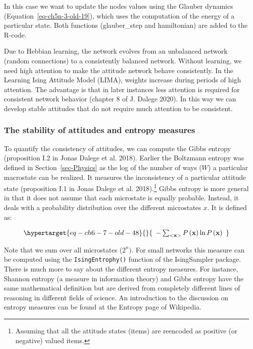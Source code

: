 \documentclass[
  a4paper,
  DIV=11,
  numbers=noendperiod,
  oneside]{scrreprt}
\begin{document}
In this case we want to update the nodes values using the Glauber
dynamics (Equation~\ref{eq-ch5n-3-old-19}), which uses the computation
of the energy of a particular state. Both functions (glauber\_step and
hamiltonian) are added to the R-code.

Due to Hebbian learning, the network evolves from an unbalanced network
(random connections) to a consistently balanced network. Without
learning, we need high attention to make the attitude network behave
consistently. In the Learning Ising Attitude Model (LIMA), weights
increase during periods of high attention. The advantage is that in
later instances less attention is required for consistent network
behavior (chapter 8 of J. Dalege 2020). In this way we can develop
stable attitudes that do not require much attention to be consistent.

\hypertarget{sec-The-stability-of-attitudes-and-entropy-measures}{%
\subsubsection{The stability of attitudes and entropy
measures}\label{sec-The-stability-of-attitudes-and-entropy-measures}}

To quantify the consistency of attitudes, we can compute the Gibbs
entropy (proposition I.2 in Jonas Dalege et al. 2018). Earlier the
Boltzmann entropy was defined in Section~\ref{sec-Physics} as the log of
the number of ways (\(W\)) a particular macrostate can be realized. It
measures the inconsistency of a particular attitude state (proposition
I.1 in Jonas Dalege et al. 2018).\footnote{Assuming that all the
  attitude states (items) are reencoded as positive (or negative) valued
  items.} Gibbs entropy is more general in that it does not assume that
each microstate is equally probable. Instead, it deals with a
probability distribution over the different microstates \(x\). It is
defined as:

\begin{equation}\protect\hypertarget{eq-ch6-7-old-48}{}{\begin{array}{r}
 - \sum_{< \mathbf{x} >}^{}{P\left( \mathbf{x} \right)\ln{P\left( \mathbf{x} \right)}}
\end{array}}\label{eq-ch6-7-old-48}\end{equation}

Note that we sum over all microstates (\(2^{n})\). For small networks
this measure can be computed using the \texttt{IsingEntrophy()} function
of the IsingSampler package. There is much more to say about the
different entropy measures. For instance, Shannon entropy (a measure in
information theory) and Gibbs entropy have the same mathematical
definition but are derived from completely different lines of reasoning
in different fields of science. An introduction to the discussion on
entropy measures can be found at the Entropy page of Wikipedia.
\end{document}
